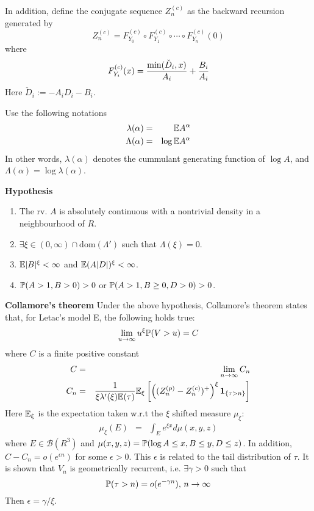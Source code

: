 \documentclass[12pt]{article}
\begin{document}
In addition, define the conjugate sequence $Z^{(c)}_n$ as
the backward recursion generated by
\[
Z^{(c)}_n = F^{(c)}_{Y_0} \circ F^{(c)}_{Y_1} \circ \cdots
\circ F^{(c)}_{Y_n}(0)
\]
where
\[
F^{(c)}_{Y_i}(x) = {\min(\check D_i, x) \over A_i} + {B_i \over A_i}
\]
Here $\check D_i := -A_i D_i - B_i$.

Use the following notations
\begin{eqnarray*}
\lambda(\alpha) &=& \E A^\alpha \\
\Lambda(\alpha) &=& \log \E A^\alpha
\end{eqnarray*}
In other words, $\lambda(\alpha)$ denotes the cummulant generating
function of $\log A$, and $\Lambda(\alpha) = \log \lambda(\alpha)$.

{\bf Hypothesis}
\begin{enumerate}
\item The rv. $A$ is absolutely continuous with a nontrivial
      density in a neighbourhood of $R$.
\item $\exists \xi \in (0, \infty) \cap \text{dom}(\Lambda')$ such that
      $\Lambda(\xi) = 0$.
\item $\E|B|^\xi < \infty$ and $\E(A|D|)^\xi < \infty$.
\item $\P(A > 1, B > 0) > 0$ or $\P(A > 1, B \geq 0, D > 0) > 0$.
\end{enumerate}

{\bf Collamore's theorem}
Under the above hypothesis, Collamore's theorem states that, for
Letac's model E, the following holds true:
\[
\lim_{u \to \infty} u^\xi \P(V > u) = C
\]
where $C$ is a finite positive constant
\begin{eqnarray*}
  C &=& \lim_{n \to \infty} C_n \\
  C_n &=&     {1 \over \xi \lambda'(\xi) \E(\tau)}
    \E_\xi \left[
    \left(
    (Z^{(p)}_n - Z^{(c)}_n)^+
    \right)^\xi \I{\tau > n}
    \right]
\end{eqnarray*}
Here $\E_{\xi}$ is the expectation taken w.r.t the $\xi$ shifted
measure $\mu_\xi$:
\begin{eqnarray*}
  \mu_\xi(E) &=& \int_E e^{\xi x} d\mu(x, y, z)
\end{eqnarray*}
where $E \in \mathcal B(R^3)$ and $\mu(x, y, z) = \P(\log A \leq x, B
\leq y, D \leq z)$. In addition, $C - C_n = o(e^{\epsilon n})$ for
some $\epsilon > 0$. This $\epsilon$ is related to the tail
distribution of $\tau$. It is shown that $V_n$ is geometrically
recurrent, i.e. $\exists \gamma > 0$ such that
\[
\P(\tau > n) = o(e^{-\gamma n}) \text{, } n \to \infty
\]
Then $\epsilon = \gamma/\xi$.
\end{document}
